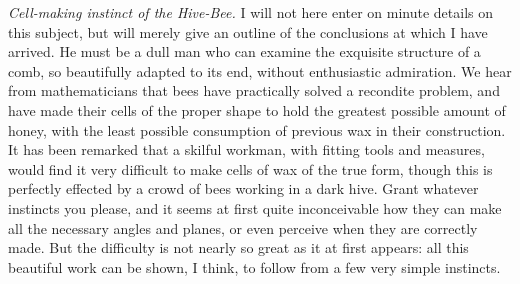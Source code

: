 \indent \emph{Cell-making instinct of the Hive-Bee.} I will not here enter on minute details on this subject, but will merely give an outline of the conclusions at which I have arrived. He must be a dull man who can examine the exquisite structure of a comb, so beautifully adapted to its end, without enthusiastic admiration. We hear from mathematicians that bees have practically solved a recondite problem, and have made their cells of the proper shape to hold the greatest possible amount of honey, with the least possible consumption of previous wax in their construction. It has been remarked that a skilful workman, with fitting tools and measures, would find it very difficult to make cells of wax of the true form, though this is perfectly effected by a crowd of bees working in a dark hive. Grant whatever instincts you please, and it seems at first quite inconceivable how they can make all the necessary angles and planes, or even perceive when they are correctly made. But the difficulty is not nearly so great as it at first appears: all this beautiful work can be shown, I think, to follow from a few very simple instincts.\\
